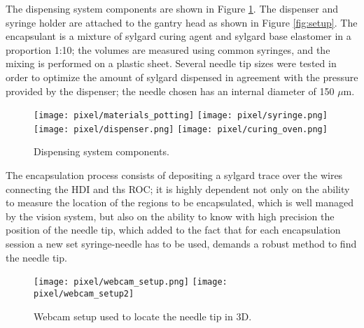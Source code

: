 The dispensing system components are shown in Figure \ref{fig:potting_comp}. The dispenser and syringe holder are attached to the gantry head as shown in Figure \ref{fig:setup}. The encapsulant is a mixture of sylgard curing agent and sylgard base elastomer in a proportion 1:10; the volumes are measured using common syringes, and the mixing is performed on a plastic sheet. Several needle tip sizes were tested in order to optimize the amount of sylgard dispensed in agreement with the pressure provided by the dispenser; the needle chosen has an internal diameter of 150 $\mu$m.

\begin{figure}[h]
  \begin{center}
    \texttt{[image: pixel/materials\_potting]}
    \texttt{[image: pixel/syringe.png]}\\
    \texttt{[image: pixel/dispenser.png]}
    \texttt{[image: pixel/curing\_oven.png]}
    \caption[Dispensing system components.]{Dispensing system components.}\label{fig:potting_comp}
  \end{center}
\end{figure}

The encapsulation process consists of depositing a sylgard trace over the wires connecting the HDI and ths ROC; it is highly dependent not only on the ability to measure the location of the regions to be encapsulated, which is well managed by the vision system, but also on the ability to know with high precision the position of the needle tip, which added to the fact that for each encapsulation session a new set syringe-needle has to be used, demands a robust method to find the needle tip.

\begin{figure}[h]
  \begin{center}
    \texttt{[image: pixel/webcam\_setup.png]}
    \texttt{[image: pixel/webcam\_setup2]}
    \caption[Webcam setup.]{Webcam setup used to locate the needle tip in 3D.}\label{fig:webcam_setup}
  \end{center}
\end{figure}

